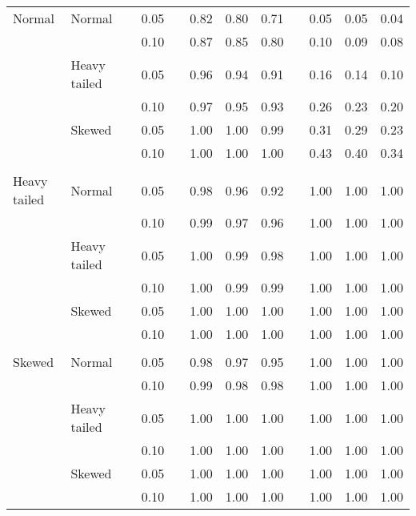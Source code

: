 \begin{table}[ht]
\begin{scriptsize}
\begin{center}
\begin{tabular}{ll p{.1cm} c p{.1cm} rrr p{.1cm} rrr}
\rowcolor{gray!20} Normal       & Normal       && 0.05 &&   0.82 & 0.80 & 0.71 && 0.05 & 0.05 & 0.04 \\ 
\rowcolor{gray!20}             &              && 0.10 &&   0.87 & 0.85 & 0.80 && 0.10 & 0.09 & 0.08 \\ 
\rowcolor{gray!20}             & Heavy tailed && 0.05 &&   0.96 & 0.94 & 0.91 && 0.16 & 0.14 & 0.10 \\ 
\rowcolor{gray!20}             &              && 0.10 &&   0.97 & 0.95 & 0.93 && 0.26 & 0.23 & 0.20 \\ 
\rowcolor{gray!20}             & Skewed       && 0.05 &&   1.00 & 1.00 & 0.99 && 0.31 & 0.29 & 0.23 \\ 
\rowcolor{gray!20}             &              && 0.10 &&   1.00 & 1.00 & 1.00 && 0.43 & 0.40 & 0.34 \\ 
             &&&&&&&&&&&\\
Heavy tailed & Normal       && 0.05 &&   0.98 & 0.96 & 0.92 && 1.00 & 1.00 & 1.00 \\ 
             &              && 0.10 &&   0.99 & 0.97 & 0.96 && 1.00 & 1.00 & 1.00 \\ 
             & Heavy tailed && 0.05 &&   1.00 & 0.99 & 0.98 && 1.00 & 1.00 & 1.00 \\ 
             &              && 0.10 &&   1.00 & 0.99 & 0.99 && 1.00 & 1.00 & 1.00 \\ 
             & Skewed       && 0.05 &&   1.00 & 1.00 & 1.00 && 1.00 & 1.00 & 1.00 \\ 
             &              && 0.10 &&   1.00 & 1.00 & 1.00 && 1.00 & 1.00 & 1.00 \\ 
             &&&&&&&&&&&\\
Skewed       & Normal       && 0.05 &&   0.98 & 0.97 & 0.95 && 1.00 & 1.00 & 1.00 \\ 
             &              && 0.10 &&   0.99 & 0.98 & 0.98 && 1.00 & 1.00 & 1.00 \\ 
             & Heavy tailed && 0.05 &&   1.00 & 1.00 & 1.00 && 1.00 & 1.00 & 1.00 \\ 
             &              && 0.10 &&   1.00 & 1.00 & 1.00 && 1.00 & 1.00 & 1.00 \\ 
             & Skewed       && 0.05 &&   1.00 & 1.00 & 1.00 && 1.00 & 1.00 & 1.00 \\ 
             &              && 0.10 &&   1.00 & 1.00 & 1.00 && 1.00 & 1.00 & 1.00 \\ 


   \hline
\end{tabular}
\end{center}
\end{scriptsize}
\end{table}


